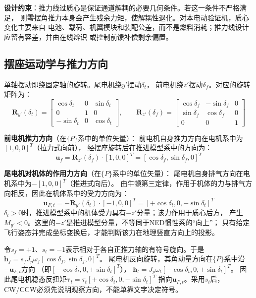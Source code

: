 \textbf{设计约束}：推力线过质心是保证通道解耦的必要几何条件。若这一条件不严格满足，
则零摆角推力本身会产生残余力矩，使解耦性退化。对本电动验证机，质心变化主要来自
电池、载荷、机翼模块和装配公差，而不是燃料消耗；推力线设计应留有容差，并由在线辨识
或控制前馈补偿剩余偏置。

\subsection{摆座运动学与推力方向}

单轴摆动即绕固定轴的旋转。尾电机绕$y'$摆动$\delta_t$，
前电机绕$z'$摆动$\delta_f$。对应的旋转矩阵为：
\begin{equation}
    \bm{R}_{y'}(\delta_t) = \begin{bmatrix}
        \cos\delta_t & 0 & \sin\delta_t \\
        0 & 1 & 0 \\
        -\sin\delta_t & 0 & \cos\delta_t
    \end{bmatrix}, \qquad
    \bm{R}_{z'}(\delta_f) = \begin{bmatrix}
        \cos\delta_f & -\sin\delta_f & 0 \\
        \sin\delta_f & \cos\delta_f & 0 \\
        0 & 0 & 1
    \end{bmatrix}
    \label{eq:gimbal_rotations}
\end{equation}

\textbf{前电机推力方向}（在$\{P\}$系中的单位矢量）：
前电机自身推力方向在电机系中为$[1,0,0]^T$（拉力式向前），
经摆座旋转后在推进模型系中的方向为：
\begin{equation}
    \bm{u}_f = \bm{R}_{z'}(\delta_f) \cdot [1, 0, 0]^T
    = [\cos\delta_f, \sin\delta_f, 0]^T
\end{equation}

\textbf{尾电机对机体的作用力方向}（在$\{P\}$系中的单位矢量）：
尾电机自身排气方向在电机系中为$-[1,0,0]^T$（推进式向后）。
由牛顿第三定律，作用于机体的力与排气方向相反，因此在机体系中的受力方向为：
\begin{equation}
    \bm{u}_{F,t} = -\bm{R}_{y'}(\delta_t) \cdot [-1, 0, 0]^T
    = [+\cos\delta_t, 0, -\sin\delta_t]^T
    \label{eq:tail_force_dir}
\end{equation}
$\delta_t > 0$时，推进模型系中的机体受力具有$-z'$分量；该力作用于质心后方，
产生$M_{y'}<0$。这里的$-z'$是推进模型分量，不等同于NED惯性系的“向上”；
只有给定飞行姿态并完成坐标变换后，才能判断该力在地理竖直方向上的投影。

令$s_f=+1$、$s_t=-1$表示相对于各自正推力轴的有符号旋向。于是
$\bm{h}_f=s_fJ_p\omega_f[\cos\delta_f,\sin\delta_f,0]^T$。
尾电机反向旋转，其角动量方向在$\{P\}$系中沿$-\bm{u}_{F,t}$方向
（即$[-\cos\delta_t, 0, +\sin\delta_t]^T$），
$\bm{h}_t = J_p \omega_t [-\cos\delta_t, 0, +\sin\delta_t]^T$。
因此尾电机稳态反扭矩$\bm{\tau}_t=\tau_t[+\cos\delta_t,0,-\sin\delta_t]^T$
指向$\bm{u}_{F,t}$。采用$s_i$后，CW/CCW必须先说明观察方向，不能单靠文字决定符号。

